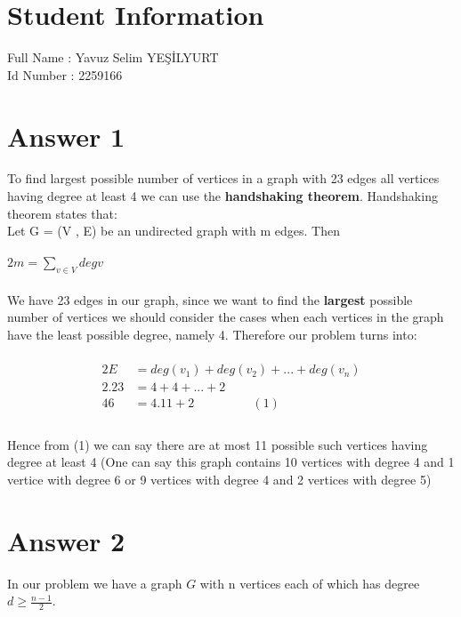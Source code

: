 \documentclass[11pt]{article}
\begin{document}
	
\section*{Student Information } 
Full Name : Yavuz Selim YEŞİLYURT \\
Id Number :  2259166 \\

\section*{Answer 1}
To find largest possible number of vertices in a graph with 23 edges all vertices having degree at least 4 we can use the \textbf{handshaking theorem}. Handshaking theorem states that:\\
Let G = (V , E) be an undirected graph with m edges. Then\\\\
$2m=\sum\limits_{v \in V} degv$\\\\
We have 23 edges in our graph, since we want to find the \textbf{largest} possible number of vertices we should consider the cases when each vertices in the graph have the least possible degree, namely 4. Therefore our problem turns into:\\\\
\begin{equation*}
\begin{split}
2E	 &=  deg(v_1) + deg(v_2) +...+ deg(v_n)   \\
2.23	 &=  4 + 4 +...+ 2 \\
46	 &=  4.11 + 2  \qquad \qquad \ \ \	(1)\\
\end{split}	 
\end{equation*} \\ 
Hence from (1) we can say there are at most 11 possible such vertices having degree at least 4 (One can say this graph contains 10 vertices with degree 4 and 1 vertice with degree 6 or 9 vertices with degree 4 and 2 vertices with degree 5)\\

\section*{Answer 2}
In our problem we have a graph $G$ with n vertices each of which has degree $d \geq \frac{n-1}{2}$.\\
\end{document}

